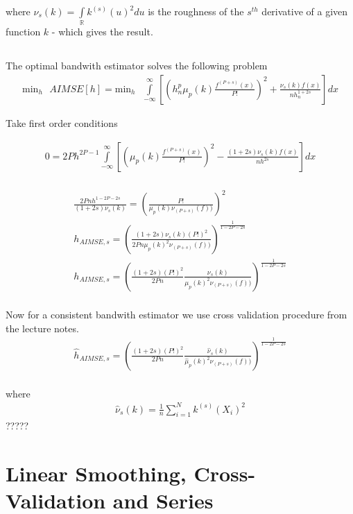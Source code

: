 \documentclass[12pt]{article}
\newcommand{\R}{\mathbb{R}}
\begin{document}
where $\nu_s(k) = \int\limits_\R k^{(s)} \left( u \right)^2 du $ is the roughness of the $s^{th}$ derivative of a given function $k$ - which gives the result.

\subsection{}

The optimal bandwith estimator solves the following problem
\begin{gather*}
\text{min}_h \text{   } AIMSE[h] = \text{min}_h \text{   } \int\limits_{-\infty}^{\infty} \left[ \left( h_n^p \mu_p(k) \frac{f^{(P+s)}(x)}{P!} \right)^2 + \frac{\nu_s(k) f(x)}{nh_n^{1+2s}} \right] dx
\end{gather*}

Take first order conditions

\begin{gather*}
0 =  2P h^{2P-1} \int\limits_{-\infty}^{\infty} \left[ \left( \mu_p(k) \frac{f^{(P+s)}(x)}{P!} \right)^2 - \frac{(1+2s) \nu_s(k) f(x)}{nh^{2s}} \right] dx\\
\end{gather*}


\begin{gather*}
\frac{2Pnh^{1-2P-2s}}{(1+2s) \nu_s(k)} = \left( \frac{P!}{\mu_p(k) \nu_{(P+s)}(f))} \right)^2\\
h_{AIMSE,s} = \left( \frac{ (1+2s) \nu_s(k) (P!)^2     }{ 2Pn \mu_p(k)^2 \nu_{(P+s)}(f))} \right)^{\frac{1}{1-2P-2s}}\\
h_{AIMSE,s} = \left( \frac{(1+2s)  (P!)^2     }{2Pn}     \frac{\nu_s(k)}{  \mu_p(k)^2 \nu_{(P+s)}(f))} \right)^{\frac{1}{1-2P-2s}}\\
\end{gather*}


Now for a consistent bandwith estimator we use cross validation procedure from the lecture notes.
\begin{gather*}
\hat{h}_{AIMSE,s} = \left( \frac{(1+2s)  (P!)^2     }{2Pn}     \frac{\hat{\nu}_s(k)}{  \hat{\mu}_p(k)^2 \hat{\nu}_{(P+s)}(f))} \right)^{\frac{1}{1-2P-2s}}\\
\end{gather*}

where
\begin{gather*}
\hat{\nu}_s(k) = \frac{1}{n}\sum\limits_{i=1}^N k^{(s)}(X_i)^2
\end{gather*}
?????

\newpage
\section{Linear Smoothing, Cross-Validation and Series}
\end{document}
